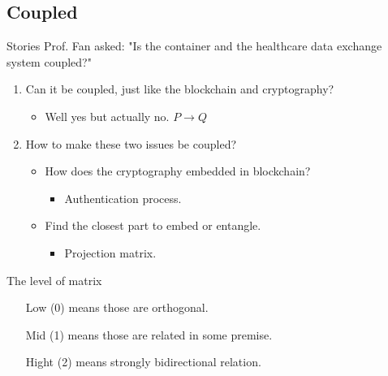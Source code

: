 \documentclass{beamer}
\begin{document}
\begin{CJK*}{UTF8}{bsmi}
  \section{Coupled}
  \begin{frame}{Stories}
    Prof. Fan asked: "Is the container and the healthcare data exchange system coupled?"\\
    \begin{enumerate}
      \item Can it be coupled, just like the blockchain and cryptography?
            \begin{itemize}
              \item Well yes but actually no. $P \rightarrow Q$
            \end{itemize}
      \item How to make these two issues be coupled?
            \begin{itemize}
              \item How does the cryptography embedded in blockchain?
                    \begin{itemize}
                      \item Authentication process.
                    \end{itemize}
              \item Find the closest part to embed or entangle.
                    \begin{itemize}
                      \item Projection matrix.
                    \end{itemize}
            \end{itemize}
    \end{enumerate}
  \end{frame}


  \begin{frame}{The level of matrix}
    \begin{enumerate}
      \item[Low]    (0) means those are orthogonal.
      \item[Mid]    (1) means those are related in some premise.
      \item[Hight]  (2) means strongly bidirectional relation.
    \end{enumerate}
  \end{frame}


\end{CJK*}
\end{document}
